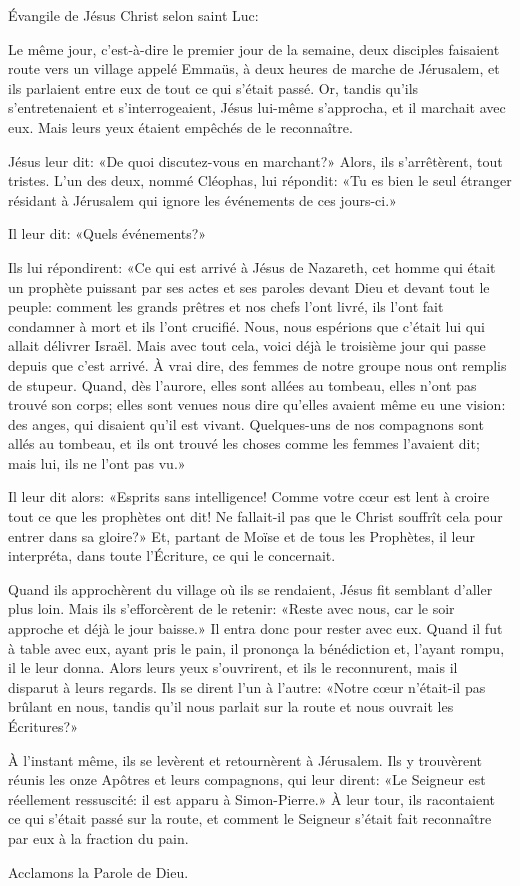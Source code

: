 \indent{} Évangile de Jésus Christ selon saint Luc:

Le même jour, c’est-à-dire le premier jour de la semaine, deux disciples faisaient route vers un village appelé Emmaüs, à deux heures de marche de Jérusalem, et ils parlaient entre eux de tout ce qui s’était passé. Or, tandis qu’ils s’entretenaient et s’interrogeaient, Jésus lui-même s’approcha, et il marchait avec eux. Mais leurs yeux étaient empêchés de le reconnaître.

Jésus leur dit: «De quoi discutez-vous en marchant?» Alors, ils s’arrêtèrent, tout tristes. L’un des deux, nommé Cléophas, lui répondit: «Tu es bien le seul étranger résidant à Jérusalem qui ignore les événements de ces jours-ci.»

Il leur dit: «Quels événements?»

Ils lui répondirent: «Ce qui est arrivé à Jésus de Nazareth, cet homme qui était un prophète puissant par ses actes et ses paroles devant Dieu et devant tout le peuple: comment les grands prêtres et nos chefs l’ont livré, ils l’ont fait condamner à mort et ils l’ont crucifié. Nous, nous espérions que c’était lui qui allait délivrer Israël. Mais avec tout cela, voici déjà le troisième jour qui passe depuis que c’est arrivé. À vrai dire, des femmes de notre groupe nous ont remplis de stupeur. Quand, dès l’aurore, elles sont allées au tombeau, elles n’ont pas trouvé son corps; elles sont venues nous dire qu’elles avaient même eu une vision: des anges, qui disaient qu’il est vivant. Quelques-uns de nos compagnons sont allés au tombeau, et ils ont trouvé les choses comme les femmes l’avaient dit; mais lui, ils ne l’ont pas vu.»

Il leur dit alors: «Esprits sans intelligence! Comme votre cœur est lent à croire tout ce que les prophètes ont dit! Ne fallait-il pas que le Christ souffrît cela pour entrer dans sa gloire?» Et, partant de Moïse et de tous les Prophètes, il leur interpréta, dans toute l’Écriture, ce qui le concernait.

Quand ils approchèrent du village où ils se rendaient, Jésus fit semblant d’aller plus loin. Mais ils s’efforcèrent de le retenir: «Reste avec nous, car le soir approche et déjà le jour baisse.» Il entra donc pour rester avec eux. Quand il fut à table avec eux, ayant pris le pain, il prononça la bénédiction et, l’ayant rompu, il le leur donna. Alors leurs yeux s’ouvrirent, et ils le reconnurent, mais il disparut à leurs regards. Ils se dirent l’un à l’autre: «Notre cœur n’était-il pas brûlant en nous, tandis qu’il nous parlait sur la route et nous ouvrait les Écritures?»

À l’instant même, ils se levèrent et retournèrent à Jérusalem. Ils y trouvèrent réunis les onze Apôtres et leurs compagnons, qui leur dirent: «Le Seigneur est réellement ressuscité: il est apparu à Simon-Pierre.» À leur tour, ils racontaient ce qui s’était passé sur la route, et comment le Seigneur s’était fait reconnaître par eux à la fraction du pain.

Acclamons la Parole de Dieu.